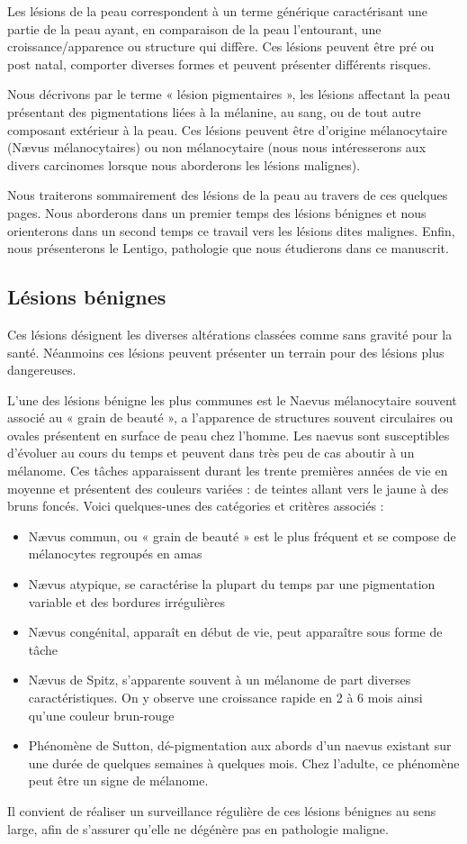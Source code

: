 Les lésions de la peau correspondent à un terme générique caractérisant une partie de la peau ayant, en comparaison de la peau l’entourant, une croissance/apparence ou structure qui diffère. Ces lésions peuvent être pré ou post natal, comporter diverses formes et peuvent présenter différents risques.\par
Nous décrivons par le terme « lésion pigmentaires », les lésions affectant la peau présentant des pigmentations liées à la mélanine, au sang, ou de tout autre composant extérieur à la peau. Ces lésions peuvent être d’origine mélanocytaire (Nævus mélanocytaires) ou non mélanocytaire (nous nous intéresserons aux divers carcinomes lorsque nous aborderons les lésions malignes).\par
Nous traiterons sommairement des lésions de la peau au travers de ces quelques pages. Nous aborderons dans un premier temps des lésions bénignes et nous orienterons dans un second temps ce travail vers les lésions dites malignes. Enfin, nous présenterons le Lentigo, pathologie que nous étudierons dans ce manuscrit.\par

\subsection{Lésions bénignes}
Ces lésions désignent les diverses altérations classées comme sans gravité pour la santé. Néanmoins ces lésions peuvent présenter un terrain pour des lésions plus dangereuses.\par
L'une des lésions bénigne les plus communes est le Naevus mélanocytaire souvent associé au « grain de beauté », a l’apparence de structures souvent circulaires ou ovales présentent en surface de peau chez l’homme. Les naevus sont susceptibles d’évoluer au cours du temps et peuvent dans très peu de cas aboutir à un mélanome. Ces tâches apparaissent durant les trente premières années de vie en moyenne et présentent des couleurs variées : de teintes allant vers le jaune à des bruns foncés. Voici quelques-unes des catégories et critères associés :
\begin{itemize}
\item Nævus commun, ou « grain de beauté » est le plus fréquent et se compose de mélanocytes regroupés en amas
\item Nævus atypique, se caractérise la plupart du temps par une pigmentation variable et des bordures irrégulières
\item Nævus congénital, apparaît en début de vie, peut apparaître sous forme de tâche
\item Nævus de Spitz, s’apparente souvent à un mélanome de part diverses caractéristiques. On y observe une croissance rapide en 2 à 6 mois ainsi qu’une couleur brun-rouge
\item Phénomène de Sutton, dé-pigmentation aux abords d’un naevus existant sur une durée de quelques semaines à quelques mois. Chez l’adulte, ce phénomène peut être un signe de mélanome.
\end{itemize}
Il convient de réaliser un surveillance régulière de ces lésions bénignes au sens large, afin de s'assurer qu'elle ne dégénère pas en pathologie maligne.\par

